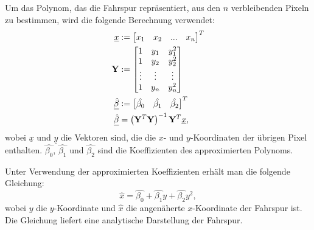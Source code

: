 \documentclass[arbeit=studie,oneside,BCOR=12mm]{ArbeitRST}
\begin{document}
Um das Polynom, das die Fahrspur repräsentiert, aus den $n$ verbleibenden
Pixeln zu bestimmen, wird die folgende Berechnung \cite{lstsq} verwendet:
\begin{subequations}
\begin{align}
    \underline{x} &:= \begin{bmatrix} x_1 & x_2 & ... & x_n \end{bmatrix}^T \\
        \bold{Y} &:= \begin{bmatrix} 1 & y_1 & y_1^2 \\ 1 & y_2 & y_2^2 \\ \vdots & \vdots & \vdots \\ 1 & y_n & y_n^2 \end{bmatrix} \\
            \underline{\hat{\beta}} &:= \begin{bmatrix} \hat{\beta_0} & \hat{\beta_1} & \hat{\beta_2} \end{bmatrix}^T \\
                \underline{\hat{\beta}} &= \left(\bold{Y}^T\bold{Y}\right)^{-1}\bold{Y}^T\underline{x},
\end{align}
\end{subequations}
wobei $\underline{x}$ und $\underline{y}$ die Vektoren sind, die die $x$- und
$y$-Koordinaten der übrigen Pixel enthalten. $\hat{\beta_0}$, $\hat{\beta_1}$ und
$\hat{\beta_2}$ sind die Koeffizienten des approximierten Polynoms. 

Unter Verwendung der approximierten Koeffizienten erhält man die folgende Gleichung:
\begin{equation}
    \hat{x} = \hat{\beta_0} + \hat{\beta_1}y + \hat{\beta_2}y^2,
    \label{poly}
\end{equation}
wobei $y$ die $y$-Koordinate und $\hat{x}$ die angenäherte $x$-Koordinate der
Fahrspur ist. Die Gleichung liefert eine analytische Darstellung der Fahrspur. 
\end{document}
